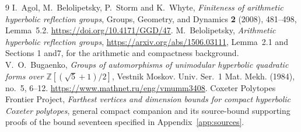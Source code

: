 \documentclass[11pt]{article}
\begin{document}
\begin{thebibliography}{9}
I.~Agol, M.~Belolipetsky, P.~Storm and K.~Whyte,
\emph{Finiteness of arithmetic hyperbolic reflection groups},
Groups, Geometry, and Dynamics \textbf{2} (2008), 481--498,
Lemma~5.2.
\url{https://doi.org/10.4171/GGD/47}.
M.~Belolipetsky, \emph{Arithmetic hyperbolic reflection groups},
\url{https://arxiv.org/abs/1506.03111}, Lemma~2.1 and
Sections 1 and7, for the arithmetic and compactness background.
V.~O.~Bugaenko, \emph{Groups of automorphisms of unimodular hyperbolic
quadratic forms over $\mathbb Z[(\sqrt5+1)/2]$}, Vestnik Moskov.
Univ. Ser.~1 Mat. Mekh. (1984), no.~5, 6--12.
\url{https://www.mathnet.ru/eng/vmumm3408}.
Coxeter Polytopes Frontier Project,
\emph{Farthest vertices and dimension bounds for compact hyperbolic
Coxeter polytopes}, general compact companion and its source-bound
supporting proofs of the bound seventeen specified in Appendix~\ref{app:sources}.
\end{thebibliography}
\end{document}
